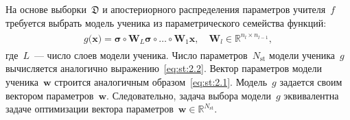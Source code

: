 \documentclass[12pt]{a&t}
\begin{document}
На основе выборки~$\mathfrak{D}$ и апостериорного распределения параметров учителя~$f$ требуется выбрать модель ученика из параметрического семейства функций:
\begin{gather}
\label{eq:st:5}
\begin{aligned}
g\bigr(\mathbf{x}\bigr) = \bm{\sigma} \circ \mathbf{W}_L\bm{\sigma}  \circ \ldots \circ \mathbf{W}_1\mathbf{x}, \quad \mathbf{W}_l \in \mathbb{R}^{n_l \times n_{l-1}},
\end{aligned}
\end{gather}
где~$L$~--- число слоев модели ученика.
Число параметров~$N_{\text{st}}$ модели ученика~$g$ вычисляется аналогично выражению~\eqref{eq:st:2.2}.
Вектор параметров модели ученика~$\mathbf{w}$ строится аналогичным образом~\eqref{eq:st:2.1}.
Модель~$g$ задается своим вектором параметров~$\mathbf{w}$.
Следовательно, задача выбора модели~$g$ эквивалентна задаче оптимизации вектора параметров~$\mathbf{w}\in\mathbb{R}^{N_{\text{st}}}$.
\end{document}
